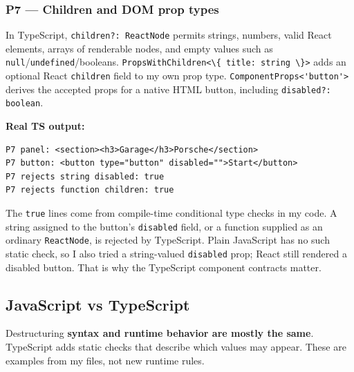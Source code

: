 \documentclass[
  9pt,
]{article}
\newcommand{\passthrough}[1]{#1}
\begin{document}
\subsubsection{P7 --- Children and DOM prop
types}\label{p7-children-and-dom-prop-types}

In TypeScript, \passthrough{\lstinline!children?: ReactNode!} permits
strings, numbers, valid React elements, arrays of renderable nodes, and
empty values such as
\passthrough{\lstinline!null!}/\passthrough{\lstinline!undefined!}/booleans.
\passthrough{\lstinline!PropsWithChildren<\{ title: string \}>!} adds an
optional React \passthrough{\lstinline!children!} field to my own prop
type. \passthrough{\lstinline!ComponentProps<'button'>!} derives the
accepted props for a native HTML button, including
\passthrough{\lstinline!disabled?: boolean!}.

\textbf{Real TS output:}

\begin{lstlisting}
P7 panel: <section><h3>Garage</h3>Porsche</section>
P7 button: <button type="button" disabled="">Start</button>
P7 rejects string disabled: true
P7 rejects function children: true
\end{lstlisting}

The \passthrough{\lstinline!true!} lines come from compile-time
conditional type checks in my code. A string assigned to the button's
\passthrough{\lstinline!disabled!} field, or a function supplied as an
ordinary \passthrough{\lstinline!ReactNode!}, is rejected by TypeScript.
Plain JavaScript has no such static check, so I also tried a
string-valued \passthrough{\lstinline!disabled!} prop; React still
rendered a disabled button. That is why the TypeScript component
contracts matter.

\subsection{JavaScript vs TypeScript}\label{javascript-vs-typescript}

Destructuring \textbf{syntax and runtime behavior are mostly the same}.
TypeScript adds static checks that describe which values may appear.
These are examples from my files, not new runtime rules.
\end{document}
